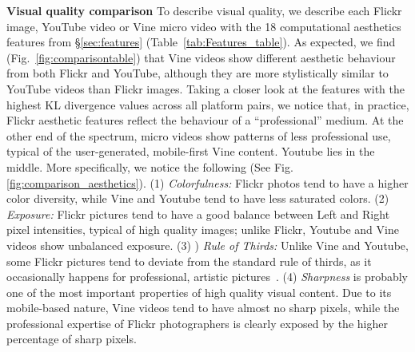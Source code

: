 \noindent\textbf{Visual quality comparison}
To describe visual quality, we describe each Flickr image, YouTube video or Vine micro video with the 18 computational aesthetics features from \S\ref{sec:features} (Table~\ref{tab:Features_table}). 
As expected, we find (Fig.~\ref{fig:comparisontable})  that Vine videos show different aesthetic behaviour from both Flickr and YouTube, although they are more stylistically similar to YouTube videos than Flickr images. Taking a closer look at the features with the highest KL divergence values across all platform pairs, we notice that, in practice, Flickr aesthetic features reflect the behaviour of a ``professional'' medium. At the other end of the spectrum, micro videos show patterns of less professional use, typical  of the  user-generated, mobile-first Vine content. Youtube lies in the middle. More specifically, we notice the following (See Fig. \ref{fig:comparison_aesthetics}). (1) \emph{Colorfulness:}  Flickr photos tend to have a higher color diversity, while Vine and Youtube tend to have less saturated colors. (2) \emph{Exposure:}  Flickr pictures tend to have a good balance between Left and Right  pixel intensities, typical of high quality images; unlike Flickr, Youtube and Vine videos show unbalanced exposure. (3) ) \emph{Rule of Thirds:}  Unlike Vine and Youtube, some Flickr pictures tend to deviate from the standard rule of thirds, as it occasionally happens for professional, artistic pictures~\cite{freeman2007photographer}.%
(4) \emph{Sharpness} is probably one of the most important properties of high quality visual content. Due to its mobile-based nature, Vine videos tend to have almost no sharp pixels, while the professional expertise of Flickr photographers is clearly exposed by the higher percentage of sharp pixels.

